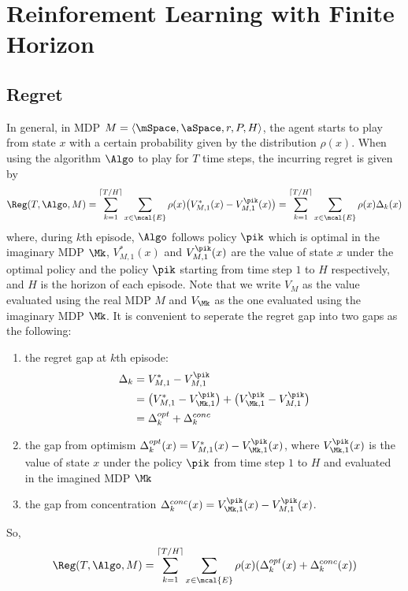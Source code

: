\chapter{Reinforement Learning with Finite Horizon}
\label{ch:rl_finite_horizon}

    \section{Regret}
    \label{sec:regret}
    
        In general, in MDP $M=\langle\mSpace,\aSpace,r,P,H\rangle$, the agent starts to play from state $x$ with a certain probability given by the distribution $\rho(x)$. When using the algorithm $\Algo$ to play for $T$ time steps, the incurring regret is given by
        \begin{align}
            \Reg(T,\Algo,M)=\sum_{k=1}^{\lceil T/H\rceil}\sum_{x\in\mcal{E}}\rho(x)\big(V_{M,1}^*(x) -V_{M,1}^{\pik}(x)\big) =\sum_{k=1}^{\lceil T/H\rceil}\sum_{x\in\mcal{E}}\rho(x)\Delta_k(x)
        \end{align}
        where, during $k$th episode, $\Algo$ follows policy $\pik$ which is optimal in the imaginary MDP $\Mk$, $V^*_{M,1}(x)$ and $V_{M,1}^{\pik}(x)$ are the value of state $x$ under the optimal policy and the policy $\pik$ starting from time step $1$ to $H$ respectively, and $H$ is the horizon of each episode.
        Note that we write $V_M$ as the value evaluated using the real MDP $M$ and $V_{\Mk}$ as the one evaluated using the imaginary MDP $\Mk$. It is convenient to seperate the regret gap into two gaps as the following:
        \begin{enumerate}
            \item the regret gap at $k$th episode:
            \begin{align*}
            \Delta_k &=V_{M,1}^* -V_{M,1}^{\pik} \\
            &=\big(V^*_{M,1} -V^{\pik}_{\Mk,1}\big) +\big(V^{\pik}_{\Mk,1} -V_{M,1}^{\pik}\big) \\
            &=\Delta_k^{opt}+\Delta_k^{conc}
            \end{align*}
        \item the gap from optimism $\Delta_k^{opt}(x)=V^*_{M,1}(x) -V^{\pik}_{\Mk,1}(x)$, where $V^{\pik}_{\Mk,1}(x)$ is the value of state $x$ under the policy $\pik$ from time step $1$ to $H$ and evaluated in the imagined MDP $\Mk$
        \item the gap from concentration $\Delta_k^{conc}(x)=V^{\pik}_{\Mk,1}(x) -V_{M,1}^{\pik}(x)$.
        \end{enumerate}
        So,
        \begin{equation}
        \label{eq:eq_6}
        \Reg(T,\Algo,M)= \sum_{k=1}^{\lceil T/H\rceil}\sum_{x\in\mcal{E}}\rho(x)(\Delta_k^{opt}(x)+\Delta_k^{conc}(x))
        \end{equation}
    
